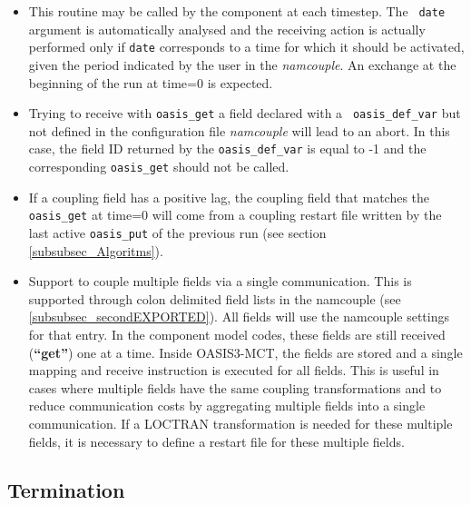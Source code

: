 \begin{itemize}

\item This routine may be called by the component at each timestep. The {\tt
  date} argument is automatically analysed and the receiving action is
actually performed only if {\tt date} corresponds to a time for which
it should be activated, given the period indicated by the user in the
{\it namcouple}. An exchange at the beginning of the run at time=0 is
expected.

\item Trying to receive with {\tt oasis\_get} a field declared with a {\tt
  oasis\_def\_var} but not defined in the configuration file {\it
  namcouple} will lead to an abort. In this case, the field ID
returned by the {\tt oasis\_def\_var} is equal to -1 and the
corresponding {\tt oasis\_get} should not be called. 

\item If a coupling field has a positive lag, the coupling field that
  matches the {\tt oasis\_get} at time=0 will come from a coupling
  restart file written by the last active {\tt oasis\_put} of the
  previous run (see section \ref{subsubsec_Algoritms}). 

\item Support to couple multiple fields via a single communication.
This is supported through colon delimited field lists in the namcouple (see \ref{subsubsec_secondEXPORTED}). 
All fields will use the namcouple settings for that entry. In the component
model codes, these fields are still received ({\bf “get”}) one at a time. Inside
OASIS3-MCT, the fields are stored and a single mapping and receive instruction is executed
for all fields. This is useful in cases where multiple fields have the same coupling transformations
and to reduce communication costs by aggregating multiple fields into a single communication. If a
LOCTRAN transformation is needed for these multiple fields, it is necessary to define a restart file
for these multiple fields.
\end{itemize}

\subsection{Termination}
\label{subsubsec_Termination}

